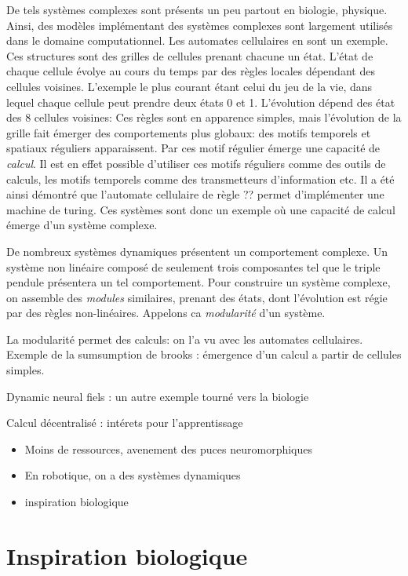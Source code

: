 De tels systèmes complexes sont présents un peu partout en biologie, physique.
Ainsi, des modèles implémentant des systèmes complexes sont largement utilisés dans le domaine computationnel. Les automates cellulaires en sont un exemple. Ces structures sont des grilles de cellules prenant chacune un état. L'état de chaque cellule évolye au cours du temps par des règles locales dépendant des cellules voisines. L'exemple le plus courant étant celui du jeu de la vie, dans lequel chaque cellule peut prendre deux états 0 et 1. L'évolution dépend des état des 8 cellules voisines:
Ces règles sont en apparence simples, mais l'évolution de la grille fait émerger des comportements plus globaux: des motifs temporels et spatiaux réguliers apparaissent. Par ces motif régulier émerge une capacité de \emph{calcul}. Il est en effet possible d'utiliser ces motifs réguliers comme des outils de calculs, les motifs temporels comme des transmetteurs d'information etc. Il a été ainsi démontré que l'automate cellulaire de règle ?? permet d'implémenter une machine de turing. Ces systèmes sont donc un exemple où une capacité de calcul émerge d'un système complexe.

De nombreux systèmes dynamiques présentent un comportement complexe. Un système non linéaire composé de seulement trois composantes tel que le triple pendule présentera un tel comportement. Pour construire un système complexe, on assemble des \emph{modules} similaires, prenant des états, dont l'évolution est régie par des règles non-linéaires. Appelons ca \emph{modularité} d'un système. 

La modularité permet des calculs: on l'a vu avec les automates cellulaires.
Exemple de la sumsumption de brooks : émergence d'un calcul a partir de cellules simples.

Dynamic neural fiels : un autre exemple tourné vers la biologie


Calcul décentralisé : intérets pour l'apprentissage
\begin{itemize}
    \item Moins de ressources, avenement des puces neuromorphiques
    \item En robotique, on a des systèmes dynamiques
    \item inspiration biologique
\end{itemize}

\section{Inspiration biologique}

